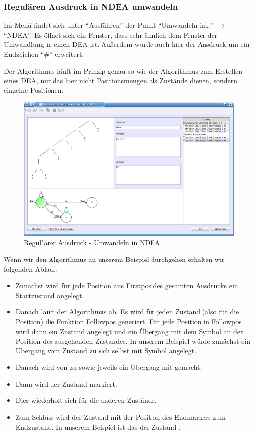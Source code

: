 \subsubsection{Regulären Ausdruck in NDEA umwandeln}

Im Menü findet sich unter "`Ausführen"' der Punkt "`Umwandeln in\ldots"' $\rightarrow$"`NDEA"'. Es öffnet sich ein Fenster, dass sehr ähnlich dem Fenster der Umwandlung in einen DEA ist. Außerdem wurde auch hier der Ausdruck um ein Endzeichen "`\#"' erweitert.

Der Algorithmus läuft im Prinzip genau so wie der Algorithmus zum Erstellen eines DEA, nur das hier nicht Positionsmengen als Zustände dienen, sondern einzelne Positionen.

\begin{figure}[h]
\begin{center}
\includegraphics[width=12cm]{../images/regex_to_nfa.png}
\caption{Regul"arer Ausdruck - Umwandeln in NDEA}
\end{center}
\end{figure}

Wenn wir den Algorithmus an unserem Beispiel durchgehen erhalten wir folgenden Ablauf:

\begin{itemize}

   \item Zunächst wird für jede Position aus Firstpos des gesamten Ausdrucks ein Startzustand angelegt.
   \item Danach läuft der Algorithmus ab. Es wird für jeden Zustand (also für die Position) die Funktion Followpos generiert. Für jede Position in Followpos wird dann ein Zustand angelegt und ein Übergang mit dem Symbol an der Position des ausgehenden Zustandes. In unserem Beispiel würde zunächst ein Übergang vom Zustand  zu sich selbst mit Symbol  angelegt.
   \item Danach wird von  zu  sowie  jeweils ein Übergang mit  gemacht.
   \item Dann wird der Zustand  markiert.
   \item Dies wiederholt sich für die anderen Zustände.
   \item Zum Schluss wird der Zustand mit der Position des Endmarkers zum Endzustand. In unserem Beispiel ist das der Zustand .

\end{itemize}

